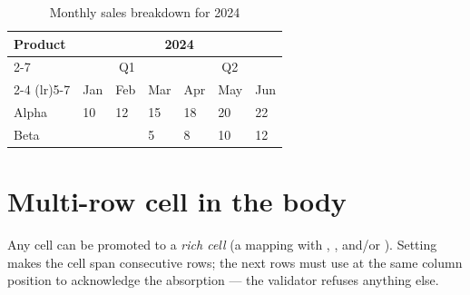 \documentclass[a4paper,twoside]{article}
\begin{document}
\begin{table}[H]
\centering
\caption{Monthly sales breakdown for 2024}
\vspace{0.5em}
\begin{tabular}{lllllll}
\toprule
\multirow{3}{*}{Product} & \multicolumn{6}{c}{2024} \\
\cmidrule(lr){2-7}
& \multicolumn{3}{c}{Q1} & \multicolumn{3}{c}{Q2} \\
\cmidrule(lr){2-4} \cmidrule(lr){5-7}
& Jan & Feb & Mar & Apr & May & Jun \\
\midrule
Alpha & 10 & 12 & 15 & 18 & 20 & 22 \\
Beta &  &  & 5 & 8 & 10 & 12 \\
\bottomrule
\end{tabular}
\end{table}
\section{Multi-row cell in the body}
Any cell can be promoted to a \emph{rich cell} (a mapping with , ,
 and/or ). Setting  makes the cell span  consecutive
rows; the next  rows must use \tscodeinline{\textasciitilde{}} at the same column position to
acknowledge the absorption --- the validator refuses anything else.
\end{document}
